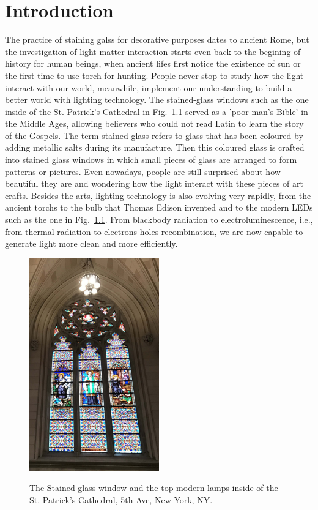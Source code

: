 \chapter{Introduction}

The practice of staining galss for decorative purposes dates to ancient Rome,
but the investigation of light matter interaction starts even back to the
begining of history for human beings, when ancient lifes first notice the
existence of sun or the first time to use torch for hunting. People never stop
to study how the light interact with our world, meanwhile, implement our
understanding to build a better world with lighting technology. The
stained-glass windows such as the one inside of the St. Patrick's Cathedral in
Fig.~\ref{StainGlass} served as a 'poor man's Bible' in the Middle Ages,
allowing believers who could not read Latin to learn the story of the Gospels.
The term stained glass refers to glass that has been coloured by adding
metallic salts during its manufacture. Then this coloured glass is crafted into
stained glass windows in which small pieces of glass are arranged to form
patterns or pictures. Even nowadays, people are still surprised about how
beautiful they are and wondering how the light interact with these pieces of
art crafts. Besides the arts, lighting technology is also evolving very
rapidly, from the ancient torchs to the bulb that Thomas Edison invented and to
the modern LEDs such as the one in Fig.~\ref{StainGlass}. From blackbody
radiation to electroluminescence, i.e., from thermal radiation to
electrons-holes recombination, we are now capable to generate light more clean
and more efficiently.

\begin{figure}
  \caption{The Stained-glass window and the top modern lamps inside of the St. Patrick's Cathedral, 5th Ave, New York, NY.}
  \centering
  \includegraphics[width=0.5\textwidth,height=0.5\textheight]{pictures/Introduction/StainGlass}
  \label{StainGlass}
\end{figure}

